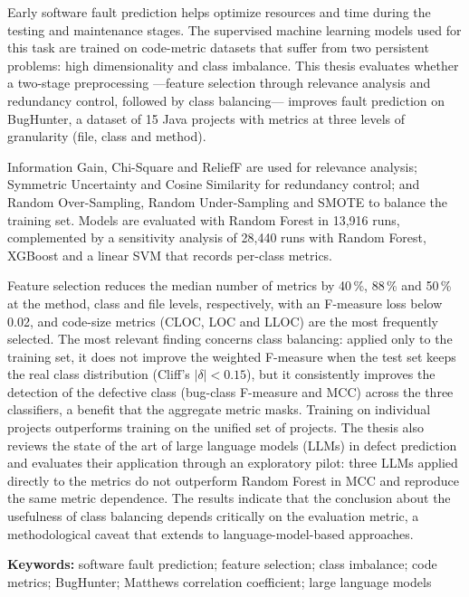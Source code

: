 \fontsize{12pt}{13}\selectfont %

Early software fault prediction helps optimize resources and time during the testing and maintenance stages. The supervised machine learning models used for this task are trained on code-metric datasets that suffer from two persistent problems: high dimensionality and class imbalance. This thesis evaluates whether a two-stage preprocessing ---feature selection through relevance analysis and redundancy control, followed by class balancing--- improves fault prediction on BugHunter, a dataset of 15 Java projects with metrics at three levels of granularity (file, class and method).

Information Gain, Chi-Square and ReliefF are used for relevance analysis; Symmetric Uncertainty and Cosine Similarity for redundancy control; and Random Over-Sampling, Random Under-Sampling and SMOTE to balance the training set. Models are evaluated with Random Forest in 13,916 runs, complemented by a sensitivity analysis of 28,440 runs with Random Forest, XGBoost and a linear SVM that records per-class metrics.

Feature selection reduces the median number of metrics by 40\,\%, 88\,\% and 50\,\% at the method, class and file levels, respectively, with an F-measure loss below 0.02, and code-size metrics (CLOC, LOC and LLOC) are the most frequently selected. The most relevant finding concerns class balancing: applied only to the training set, it does not improve the weighted F-measure when the test set keeps the real class distribution (Cliff's $|\delta| < 0.15$), but it consistently improves the detection of the defective class (bug-class F-measure and MCC) across the three classifiers, a benefit that the aggregate metric masks. Training on individual projects outperforms training on the unified set of projects. The thesis also reviews the state of the art of large language models (LLMs) in defect prediction and evaluates their application through an exploratory pilot: three LLMs applied directly to the metrics do not outperform Random Forest in MCC and reproduce the same metric dependence. The results indicate that the conclusion about the usefulness of class balancing depends critically on the evaluation metric, a methodological caveat that extends to language-model-based approaches.

\hfill \break
\textbf{Keywords:} software fault prediction; feature selection; class imbalance; code metrics; BugHunter; Matthews correlation coefficient; large language models
